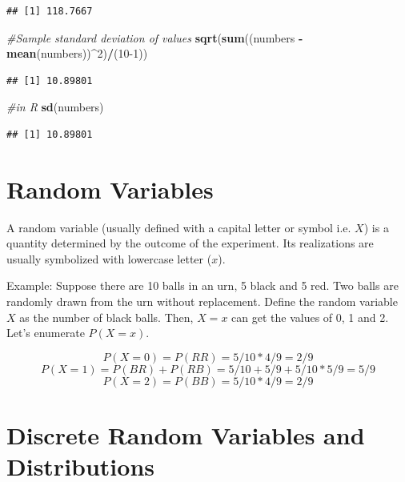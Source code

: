 \documentclass[]{book}
\newenvironment{Shaded}{\begin{snugshade}}{\end{snugshade}}
\newcommand{\CommentTok}[1]{\textcolor[rgb]{0.56,0.35,0.01}{\textit{#1}}}
\newcommand{\DecValTok}[1]{\textcolor[rgb]{0.00,0.00,0.81}{#1}}
\newcommand{\KeywordTok}[1]{\textcolor[rgb]{0.13,0.29,0.53}{\textbf{#1}}}
\newcommand{\NormalTok}[1]{#1}
\newcommand{\OperatorTok}[1]{\textcolor[rgb]{0.81,0.36,0.00}{\textbf{#1}}}
\newcommand{\StringTok}[1]{\textcolor[rgb]{0.31,0.60,0.02}{#1}}
\theoremstyle{definition}
\theoremstyle{definition}
\theoremstyle{definition}
\theoremstyle{remark}
\begin{document}
\begin{verbatim}
## [1] 118.7667
\end{verbatim}

\begin{Shaded}
\begin{Highlighting}[]
\CommentTok{#Sample standard deviation of values}
\KeywordTok{sqrt}\NormalTok{(}\KeywordTok{sum}\NormalTok{((numbers }\OperatorTok{-}\StringTok{ }\KeywordTok{mean}\NormalTok{(numbers))}\OperatorTok{^}\DecValTok{2}\NormalTok{)}\OperatorTok{/}\NormalTok{(}\DecValTok{10-1}\NormalTok{))}
\end{Highlighting}
\end{Shaded}

\begin{verbatim}
## [1] 10.89801
\end{verbatim}

\begin{Shaded}
\begin{Highlighting}[]
\CommentTok{#in R}
\KeywordTok{sd}\NormalTok{(numbers)}
\end{Highlighting}
\end{Shaded}

\begin{verbatim}
## [1] 10.89801
\end{verbatim}

\hypertarget{random-variables}{%
\section{Random Variables}\label{random-variables}}

A random variable (usually defined with a capital letter or symbol i.e.
\(X\)) is a quantity determined by the outcome of the experiment. Its
realizations are usually symbolized with lowercase letter (\(x\)).

Example: Suppose there are 10 balls in an urn, 5 black and 5 red. Two
balls are randomly drawn from the urn without replacement. Define the
random variable \(X\) as the number of black balls. Then, \(X = x\) can
get the values of 0, 1 and 2. Let's enumerate \(P(X = x)\).

\[P(X = 0) = P(RR) = 5/10 * 4/9 = 2/9\]
\[P(X = 1) = P(BR) + P(RB) = 5/10 + 5/9 + 5/10 * 5/9 = 5/9\]
\[P(X = 2) = P(BB) = 5/10 * 4/9 = 2/9\]

\hypertarget{discrete-random-variables-and-distributions}{%
\section{Discrete Random Variables and
Distributions}\label{discrete-random-variables-and-distributions}}
\end{document}
